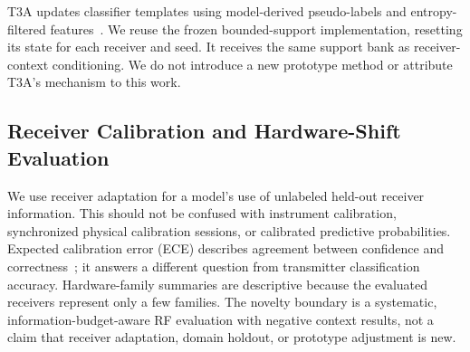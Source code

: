 T3A updates classifier templates using model-derived pseudo-labels and entropy-filtered features~\cite{t3a}. We reuse the frozen bounded-support implementation, resetting its state for each receiver and seed. It receives the same support bank as receiver-context conditioning. We do not introduce a new prototype method or attribute T3A's mechanism to this work.

\subsection{Receiver Calibration and Hardware-Shift Evaluation}
We use receiver adaptation for a model's use of unlabeled held-out receiver information. This should not be confused with instrument calibration, synchronized physical calibration sessions, or calibrated predictive probabilities. Expected calibration error (ECE) describes agreement between confidence and correctness~\cite{calibration}; it answers a different question from transmitter classification accuracy. Hardware-family summaries are descriptive because the evaluated receivers represent only a few families. The novelty boundary is a systematic, information-budget-aware RF evaluation with negative context results, not a claim that receiver adaptation, domain holdout, or prototype adjustment is new.
